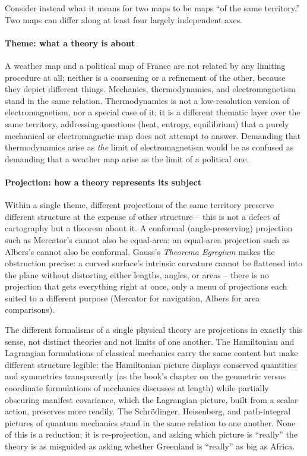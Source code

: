 Consider instead what it means for two maps to be maps ``of the same territory.''
Two maps can differ along at least four largely independent axes.

\paragraph{Theme: what a theory is about}

A weather map and a political map of France are not related by any limiting
procedure at all; neither is a coarsening or a refinement of the other, because
they depict different things. Mechanics, thermodynamics, and electromagnetism
stand in the same relation. Thermodynamics is not a low-resolution version of
electromagnetism, nor a special case of it; it is a different thematic layer
over the same territory, addressing questions (heat, entropy, equilibrium) that
a purely mechanical or electromagnetic map does not attempt to answer.
Demanding that thermodynamics arise as \emph{the} limit of electromagnetism
would be as confused as demanding that a weather map arise as the limit of a
political one.

\paragraph{Projection: how a theory represents its subject}

Within a single theme, different projections of the same territory preserve
different structure at the expense of other structure -- this is not a defect
of cartography but a theorem about it. A conformal (angle-preserving)
projection such as Mercator's cannot also be equal-area; an equal-area
projection such as Albers's cannot also be conformal. Gauss's \emph{Theorema
Egregium} makes the obstruction precise: a curved surface's intrinsic curvature
cannot be flattened into the plane without distorting either lengths, angles,
or areas -- there is no projection that gets everything right at once, only a
menu of projections each suited to a different purpose (Mercator for
navigation, Albers for area comparisons).

The different formalisms of a single physical theory are projections in exactly
this sense, not distinct theories and not limits of one another. The
Hamiltonian and Lagrangian formulations of classical mechanics carry the same
content but make different structure legible: the Hamiltonian picture displays
conserved quantities and symmetries transparently (as the book's chapter on the
geometric versus coordinate formulations of mechanics discusses at length)
while partially obscuring manifest covariance, which the Lagrangian picture,
built from a scalar action, preserves more readily. The Schr\"odinger,
Heisenberg, and path-integral pictures of quantum mechanics stand in the same
relation to one another. None of this is a reduction; it is re-projection, and
asking which picture is ``really'' the theory is as misguided as asking whether
Greenland is ``really'' as big as Africa.

